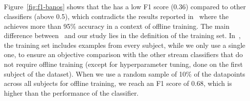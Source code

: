 \subsection{\FNN}

Figure~\ref{fig:f1-banos} shows that the \FNN has a low F1 score (0.36)
compared to other classifiers (above 0.5), which contradicts the results
reported in~\cite{omid_2019} where the \FNN achieves more than 95\%
accuracy in a context of offline training. The main difference
between~\cite{omid_2019} and our study lies in the definition of the
training set. In~\cite{omid_2019}, the training set includes examples from
every subject, while we only use a single one, to ensure an objective
comparison with the other stream classifiers that do not require offline
training (except for hyperparameter tuning, done on the first subject of
the \banosdataset dataset). When we use a random sample of 10\% of the
datapoints across all subjects for offline training, we reach an F1 score
of 0.68, which is higher than the performance of the \naivebayes classifier.


